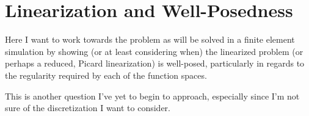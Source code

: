 \section{Linearization and Well-Posedness}
    \begin{remark}
        Here I want to work towards the problem as will be solved in a finite element simulation by showing (or at least considering when) the linearized problem (or perhaps a reduced, Picard linearization) is well-posed, particularly in regards to the regularity required by each of the function spaces.
        
        This is another question I've yet to begin to approach, especially since I'm not sure of the discretization I want to consider.
    \end{remark}
